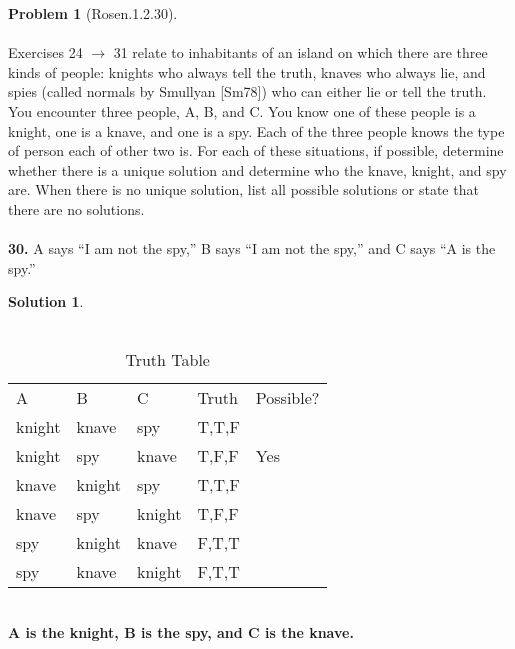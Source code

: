 \documentclass{article}
\theoremstyle{definition}
\newtheorem*{problem}{Problem}
\newtheorem*{solution}{Solution}
\begin{document}
\begin{problem}[Rosen.1.2.30]\ \\
\ \\
Exercises 24 $\rightarrow$ 31 relate to inhabitants of an island on which
there are three kinds of people: knights who always tell the
truth, knaves who always lie, and spies (called normals by
Smullyan [Sm78]) who can either lie or tell the truth. You
encounter three people, A, B, and C. You know one of these
people is a knight, one is a knave, and one is a spy. Each of the
three people knows the type of person each of other two is. For
each of these situations, if possible, determine whether there
is a unique solution and determine who the knave, knight, and
spy are. When there is no unique solution, list all possible
solutions or state that there are no solutions.\ \\
\ \\
\textbf{30.} A says “I am not the spy,” B says “I am not the spy,” and C says “A is the spy.”
\begin{compactenum}
\renewcommand{\theenumi}{\alph{enumi}}

\end{compactenum}
\end{problem}

\begin{solution}\ \\
\ \\

\begin{compactenum}
\renewcommand{\theenumi}{\alph{enumi}}
\begin{table}[htbp]
  \centering
  \caption{Truth Table}
    \begin{tabular}{llllr}
    A     & B     & C     & Truth & \multicolumn{1}{l}{Possible?} \\
    knight & knave & spy   & T,T,F &  \\
    knight & spy   & knave & T,F,F & \multicolumn{1}{l}{Yes} \\
    knave & knight & spy   & T,T,F &  \\
    knave & spy   & knight & T,F,F &  \\
    spy   & knight & knave & F,T,T &  \\
    spy   & knave & knight & F,T,T &  \\
    \end{tabular}%
  \label{tab:addlabel}%
\end{table}%
\ \\
\textbf{A is the knight, B is the spy, and C is the knave.}

\end{compactenum}
\end{solution}
\end{document}
